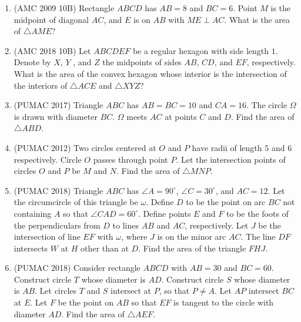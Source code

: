 \documentclass[11pt]{scrartcl}
\begin{document}
\begin{enumerate}
    \item (AMC 2009 10B) Rectangle $ABCD$ has $AB = 8$ and $BC = 6$. Point $M$ is the midpoint of diagonal $AC$, and $E$ is on $AB$ with $ME \perp AC$. What is the area of $\triangle AME$?


    \item (AMC 2018 10B) Let $ABCDEF$ be a regular hexagon with side length $1$. Denote by $X$, $Y$ , and $Z$ the midpoints of sides $AB$, $CD$, and $EF$, respectively. What is the area of the convex hexagon whose interior is the intersection of the interiors of $\triangle ACE$ and $\triangle XYZ$?


    \item (PUMAC 2017) Triangle $ABC$ has $AB = BC = 10$ and $CA = 16$. The circle $\Omega$ is drawn with diameter $BC$. $\Omega$ meets $AC$ at points $C$ and $D$. Find the area of $\triangle ABD$.


    \item (PUMAC 2012) Two circles centered at $O$ and $P$ have radii of length $5$ and $6$ respectively. Circle $O$ passes through point $P$. Let the intersection points of circles $O$ and $P$ be $M$ and $N$. Find the area of $\triangle MNP$.


    \item (PUMAC 2018) Triangle $ABC$ has $\angle A = 90^\circ$, $\angle C = 30^\circ$, and $AC = 12$. Let the circumcircle of this triangle be $\omega$. Define $D$ to be the point on arc $BC$ not containing $A$ so that $\angle CAD = 60^\circ$. Define points $E$ and $F$ to be the foots of the perpendiculars from $D$ to lines $AB$ and $AC$, respectively. Let $J$ be the intersection of line $EF$ with $\omega$, where $J$ is on the minor arc $AC$. The line $DF$ intersects $W$ at $H$ other than at $D$. Find the area of the triangle $FHJ$.


    \item (PUMAC 2018) Consider rectangle $ABCD$ with $AB = 30$ and $BC = 60$. Construct circle $T$ whose diameter is $AD$. Construct circle $S$ whose diameter is $AB$. Let circles $T$ and $S$ intersect at $P$, so that $P \neq A$. Let $AP$ intersect $BC$ at $E$. Let $F$ be the point on $AB$ so that $EF$ is tangent to the circle with diameter $AD$. Find the area of $\triangle AEF$.
\end{enumerate}
\end{document}
